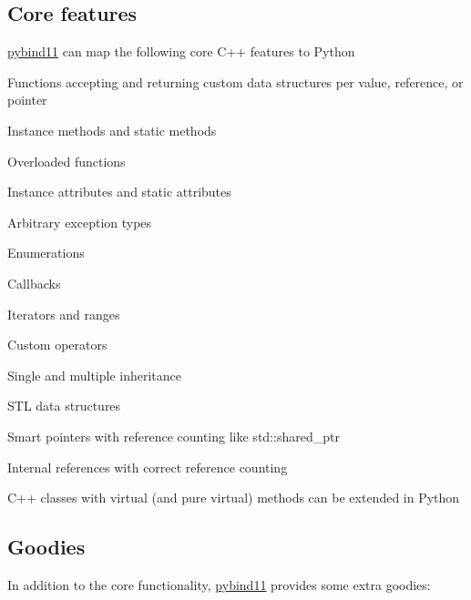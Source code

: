 \subsection*{Core features}

\mbox{\hyperlink{namespacepybind11}{pybind11}} can map the following core C++ features to Python


\begin{DoxyItemize}
\item Functions accepting and returning custom data structures per value, reference, or pointer
\item Instance methods and static methods
\item Overloaded functions
\item Instance attributes and static attributes
\item Arbitrary exception types
\item Enumerations
\item Callbacks
\item Iterators and ranges
\item Custom operators
\item Single and multiple inheritance
\item S\+TL data structures
\item Smart pointers with reference counting like {\ttfamily std\+::shared\+\_\+ptr}
\item Internal references with correct reference counting
\item C++ classes with virtual (and pure virtual) methods can be extended in Python
\end{DoxyItemize}

\subsection*{Goodies}

In addition to the core functionality, \mbox{\hyperlink{namespacepybind11}{pybind11}} provides some extra goodies\+:


